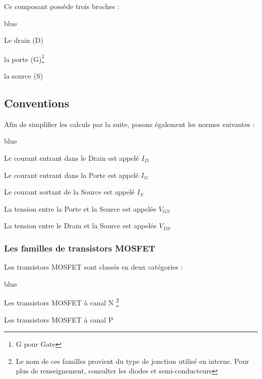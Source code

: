      Ce composant possède trois broches : 
     
     \begin{items}{blue}{\Triangle}
     
       \item Le drain (D)
       \item la porte (G)\footnote{G pour Gate}
       \item la source (S)
     
     \end{items}
     
     
     \subsection{Conventions}
     
     Afin de simplifier les calculs par la suite, posons également les normes suivantes : 
     
     \begin{items}{blue}{\Triangle}
     
       \item Le courant entrant dans le Drain est appelé $I_{D}$
       \item Le courant entrant dans la Porte est appelé $I_{G}$
       \item Le courant sortant de la Source est appelé $I_{S}$

       \item La tension entre la Porte et la Source est appelée $V_{GS}$
       \item La tension entre le Drain et la Source est appelée $V_{DS}$
     \end{items}
     
     \subsubsection{Les familles de transistors MOSFET}

     Les transistors MOSFET sont classés en deux catégories : 
     
     \begin{items}{blue}{\Triangle}
     
       \item Les transistors MOSFET à canal N \footnote{Le nom de ces familles provient du type de jonction utilisé en interne. Pour plus de renseignement, consulter les diodes et semi-conducteurs}
       \item Les transistors MOSFET à canal P
     
     \end{items}
     
